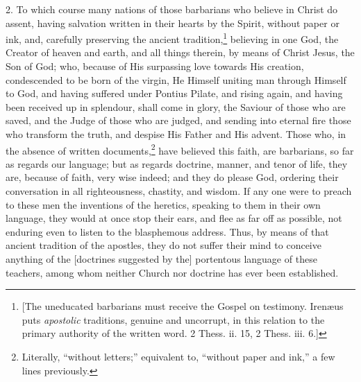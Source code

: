 2. To which course many nations of those barbarians who believe in Christ do assent, having salvation written in their hearts by the Spirit, without paper or ink, and, carefully preserving the ancient tradition,\footnote{[The uneducated barbarians must receive the Gospel on testimony. Irenæus puts \emph{apostolic} traditions, genuine and uncorrupt, in this relation to the primary authority of the written word. 2 Thess. ii. 15, 2 Thess. iii. 6.]} believing in one God, the Creator of heaven and earth, and all things therein, by means of Christ Jesus, the Son of God; who, because of His surpassing love towards His creation, condescended to be born of the virgin, He Himself uniting man through Himself to God, and having suffered under Pontius Pilate, and rising again, and having been received up in splendour, shall come in glory, the Saviour of those who are saved, and the Judge of those who are judged, and sending into eternal fire those who transform the truth, and despise His Father and His advent. Those who, in the absence of written documents,\footnote{Literally, “without letters;” equivalent to, “without paper and ink,” a few lines previously.} have believed this faith, are barbarians, so far as regards our language; but as regards doctrine, manner, and tenor of life, they are, because of faith, very wise indeed; and they do please God, ordering their conversation in all righteousness, chastity, and wisdom. If any one were to preach to these men the inventions of the heretics, speaking to them in their own language, they would at once stop their ears, and flee as far off as possible, not enduring even to listen to the blasphemous address. Thus, by means of that ancient tradition of the apostles, they do not suffer their mind to conceive anything of the [doctrines suggested by the] portentous language of these teachers, among whom neither Church nor doctrine has ever been established.

